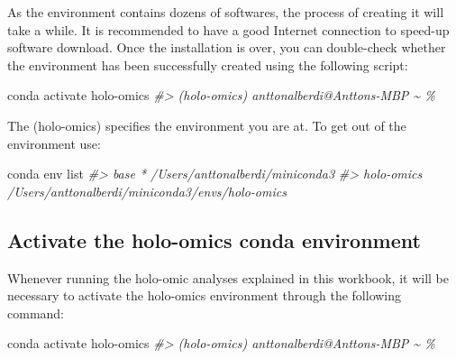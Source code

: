 \documentclass[
]{book}
\newenvironment{Shaded}{\begin{snugshade}}{\end{snugshade}}
\newcommand{\CommentTok}[1]{\textcolor[rgb]{0.56,0.35,0.01}{\textit{#1}}}
\newcommand{\ExtensionTok}[1]{#1}
\newcommand{\NormalTok}[1]{#1}
\begin{document}
\normalsize

As the environment contains dozens of softwares, the process of creating it will take a while. It is recommended to have a good Internet connection to speed-up software download. Once the installation is over, you can double-check whether the environment has been successfully created using the following script:

\small

\begin{Shaded}
\begin{Highlighting}[]
\ExtensionTok{conda}\NormalTok{ activate holo{-}omics}
\CommentTok{\#\textgreater{} (holo{-}omics) anttonalberdi@Anttons{-}MBP \textasciitilde{} \%}
\end{Highlighting}
\end{Shaded}

\normalsize

The (holo-omics) specifies the environment you are at. To get out of the environment use:

\small

\begin{Shaded}
\begin{Highlighting}[]
\ExtensionTok{conda}\NormalTok{ env list}
\CommentTok{\#\textgreater{} base                  *  /Users/anttonalberdi/miniconda3}
\CommentTok{\#\textgreater{} holo{-}omics               /Users/anttonalberdi/miniconda3/envs/holo{-}omics}
\end{Highlighting}
\end{Shaded}

\normalsize

\hypertarget{activate-the-holo-omics-conda-environment}{%
\subsection*{Activate the holo-omics conda environment}\label{activate-the-holo-omics-conda-environment}}

Whenever running the holo-omic analyses explained in this workbook, it will be necessary to activate the holo-omics environment through the following command:

\small

\begin{Shaded}
\begin{Highlighting}[]
\ExtensionTok{conda}\NormalTok{ activate holo{-}omics}
\CommentTok{\#\textgreater{} (holo{-}omics) anttonalberdi@Anttons{-}MBP \textasciitilde{} \%}
\end{Highlighting}
\end{Shaded}
\end{document}
